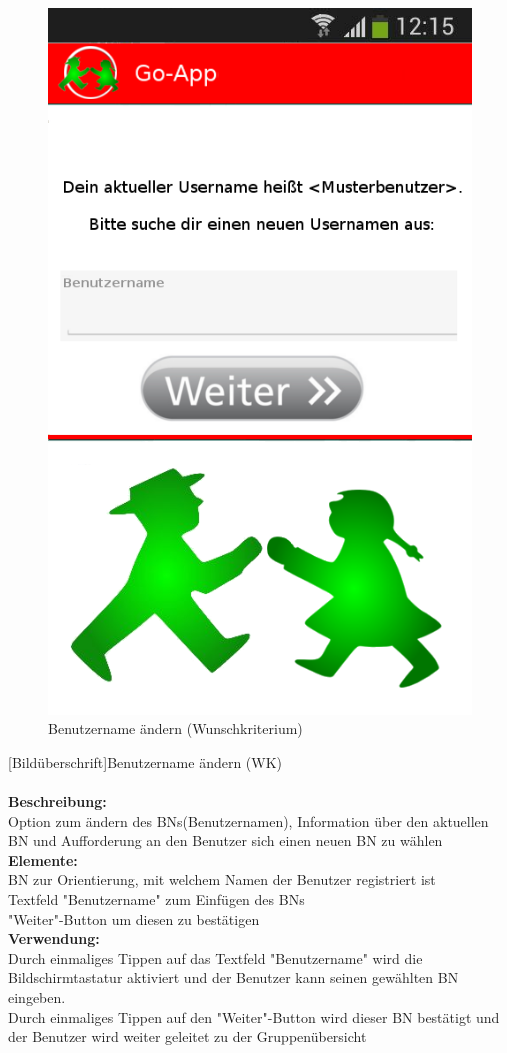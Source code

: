 \begin{figure}
	\caption{Benutzername ändern (Wunschkriterium)}
		\includegraphics[scale =0.5]{resources/images/username_aendern.png}
\end{figure}

[Bildüberschrift]Benutzername ändern (WK)\\ \\
\textbf{Beschreibung:}\\
Option zum ändern des BNs(Benutzernamen), Information über den aktuellen BN und Aufforderung an den Benutzer sich einen neuen BN zu wählen\\
\textbf{Elemente:}\\
BN zur Orientierung, mit welchem Namen der Benutzer registriert ist\\
Textfeld "Benutzername" zum Einfügen des BNs\\
"Weiter"-Button um diesen zu bestätigen\\
\textbf{Verwendung:}\\
Durch einmaliges Tippen auf das Textfeld "Benutzername" wird die Bildschirmtastatur aktiviert und der Benutzer kann seinen gewählten BN eingeben.\\
Durch einmaliges Tippen auf den "Weiter"-Button wird dieser BN bestätigt und der Benutzer wird weiter geleitet zu der Gruppenübersicht